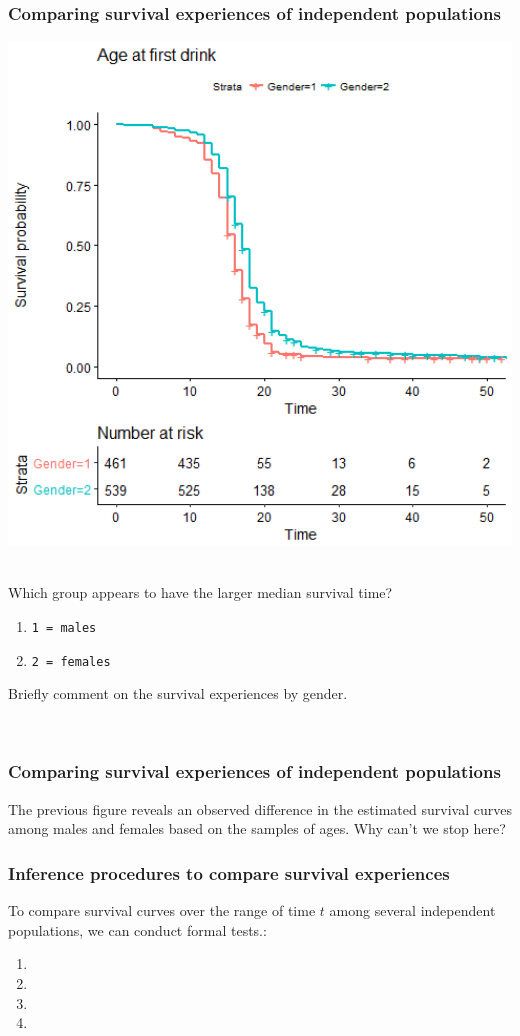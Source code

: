\begin{frame}
\frametitle{Comparing survival experiences of independent populations}
\hspace*{-0.3in}
\includegraphics[width=1.0\textwidth]{Figures/KM_drink_gender.png}
\vskip200pt
\textcolor{white}{e}
\emp
\blankcolumn
{}
\small{
\begin{clicker}{\small{Which group appears to have the larger median survival time?}}
\begin{enumerate}
\item \texttt{1 = males}
\item \texttt{2 = females}
\end{enumerate}
\end{clicker}
\vskip2pt
Briefly comment on the survival experiences by gender.}
\vskip300pt
\textcolor{white}{e}
\emp
\end{frame}

\begin{frame}
\frametitle{Comparing survival experiences of independent populations}
The previous figure reveals an observed difference in the estimated survival curves among males and females based on the samples of ages.  Why can't we stop here?
\vskip300pt
\end{frame}

\begin{frame}
\frametitle{Inference procedures to compare survival experiences}
To compare survival curves over the range of time $t$ among several independent populations, we can conduct formal tests.:
\begin{enumerate}
\item
\item[]
\item
\item[]
\end{enumerate}
\end{frame}

